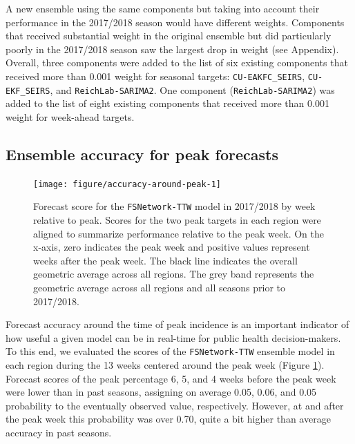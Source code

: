 \documentclass{article}\usepackage[]{graphicx}\usepackage[]{color}
\newenvironment{knitrout}{}{} %
\begin{document}
A new ensemble using the same components but taking into account their performance in the 2017/2018 season would have different weights.
Components that received substantial weight in the original ensemble but did particularly poorly in the 2017/2018 season saw the largest drop in weight (see Appendix). 
Overall, three components were added to the list of six existing components that received more than 0.001 weight for seasonal targets: {\tt CU-EAKFC\_SEIRS}, {\tt CU-EKF\_SEIRS}, and {\tt ReichLab-SARIMA2}.
One component ({\tt ReichLab-SARIMA2}) was added to the list of eight existing components that received more than 0.001 weight for week-ahead targets.


\subsection{Ensemble accuracy for peak forecasts}

\begin{knitrout}
\color{fgcolor}\begin{figure}
\texttt{[image: figure/accuracy-around-peak-1]} \caption[Forecast score for the {\tt FSNetwork-TTW} model in 2017/2018 by week relative to peak]{Forecast score for the {\tt FSNetwork-TTW} model in 2017/2018 by week relative to peak. Scores for the two peak targets in each region were aligned to summarize performance relative to the peak week. On the x-axis, zero indicates the peak week and positive values represent weeks after the peak week. The black line indicates the overall geometric average across all regions. The grey band represents the geometric average across all regions and all seasons prior to 2017/2018.}\label{fig:accuracy-around-peak}
\end{figure}


\end{knitrout}


Forecast accuracy around the time of peak incidence is an important indicator of how useful a given model can be in real-time for public health decision-makers.
To this end, we evaluated the scores of the {\tt FSNetwork-TTW} ensemble model in each region during the 13 weeks centered around the peak week (Figure \ref{fig:accuracy-around-peak}).
Forecast scores of the peak percentage 6, 5, and 4 weeks before the peak week were lower than in past seasons, assigning on average
0.05,
0.06, and 
0.05
probability to the eventually observed value, respectively. 
However, at and after the peak week this probability was over 0.70, quite a bit higher than average accuracy in past seasons.
\end{document}
